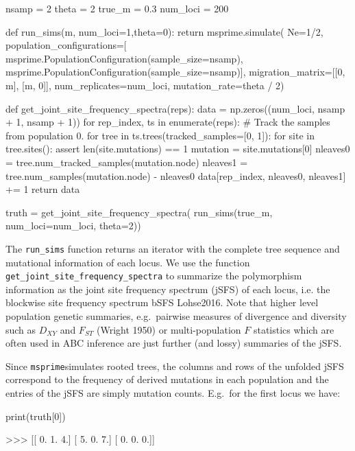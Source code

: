 \documentclass[graybox]{svmult}
\newcommand{\msprime}[0]{\texttt{msprime}}
\begin{document}
\begin{pythoncode}
nsamp = 2
theta = 2
true_m = 0.3
num_loci = 200

def run_sims(m, num_loci=1,theta=0):
    return msprime.simulate(
        Ne=1/2,
        population_configurations=[
            msprime.PopulationConfiguration(sample_size=nsamp),
            msprime.PopulationConfiguration(sample_size=nsamp)],
        migration_matrix=[[0, m], [m, 0]],
        num_replicates=num_loci,
        mutation_rate=theta / 2)

def get_joint_site_frequency_spectra(reps):
    data = np.zeros((num_loci, nsamp + 1, nsamp + 1))
    for rep_index, ts in enumerate(reps):
        # Track the samples from population 0.
        for tree in ts.trees(tracked_samples=[0, 1]):
            for site in tree.sites():
                assert len(site.mutations) == 1
                mutation = site.mutations[0]
                nleaves0 = tree.num_tracked_samples(mutation.node)
                nleaves1 = tree.num_samples(mutation.node) - nleaves0
                data[rep_index, nleaves0, nleaves1] += 1
    return data

truth = get_joint_site_frequency_spectra(
    run_sims(true_m, num_loci=num_loci, theta=2))
\end{pythoncode}

    The \texttt{run\_sims} function returns an iterator with the complete
tree sequence and mutational information of each locus. We use the
function \texttt{get\_joint\_site\_frequency\_spectra} to summarize the
polymorphism information as the joint site frequency spectrum (jSFS) of
each locus, i.e. the blockwise site frequency spectrum bSFS \citep{sensu }{Lohse2016}. Note that higher level population genetic summaries, e.g.\ pairwise
measures of divergence and diversity such as \(D_{XY}\) \citep{Nei1972} and
\(F_{ST}\) (Wright 1950) or multi-population \(F\) statistics \citep{Durand2009, Patterson2012} which are often used in ABC inference are just further (and lossy) summaries of the jSFS.

Since \msprime simulates rooted trees, the columns and rows
of the unfolded jSFS correspond to the frequency of derived mutations in
each population and the entries of the jSFS are simply mutation counts.
E.g.\ for the first locus we have:
\begin{pythoncode}
print(truth[0])

>>> [[ 0.  1.  4.]
     [ 5.  0.  7.]
     [ 0.  0.  0.]]
\end{pythoncode}
\end{document}

